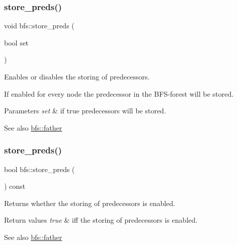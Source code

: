 \subsubsection{\texorpdfstring{store\+\_\+preds()}{store\_preds()}\hspace{0.1cm}{\footnotesize\ttfamily [1/2]}}
{\footnotesize\ttfamily void bfs\+::store\+\_\+preds (\begin{DoxyParamCaption}\item[{bool}]{set }\end{DoxyParamCaption})}



Enables or disables the storing of predecessors. 

If enabled for every node the predecessor in the B\+F\+S-\/forest will be stored.


\begin{DoxyParams}{Parameters}
{\em set} & if true predecessors will be stored. \\
\hline
\end{DoxyParams}
\begin{DoxySeeAlso}{See also}
\mbox{\hyperlink{classbfs_a3e1a7b0e4bde586d0be44616e533c59c}{bfs\+::father}} 
\end{DoxySeeAlso}
\mbox{\label{classbfs_ac4373b51885382f6f1a9312c1b0923bd}} 
\subsubsection{\texorpdfstring{store\+\_\+preds()}{store\_preds()}\hspace{0.1cm}{\footnotesize\ttfamily [2/2]}}
{\footnotesize\ttfamily bool bfs\+::store\+\_\+preds (\begin{DoxyParamCaption}{ }\end{DoxyParamCaption}) const\hspace{0.3cm}{\ttfamily [inline]}}



Returns whether the storing of predecessors is enabled. 


\begin{DoxyRetVals}{Return values}
{\em true} & iff the storing of predecessors is enabled. \\
\hline
\end{DoxyRetVals}
\begin{DoxySeeAlso}{See also}
\mbox{\hyperlink{classbfs_a3e1a7b0e4bde586d0be44616e533c59c}{bfs\+::father}} 
\end{DoxySeeAlso}
\mbox{\label{classbfs_a56959215efdfee1a37826ad315ac13e7}} 
